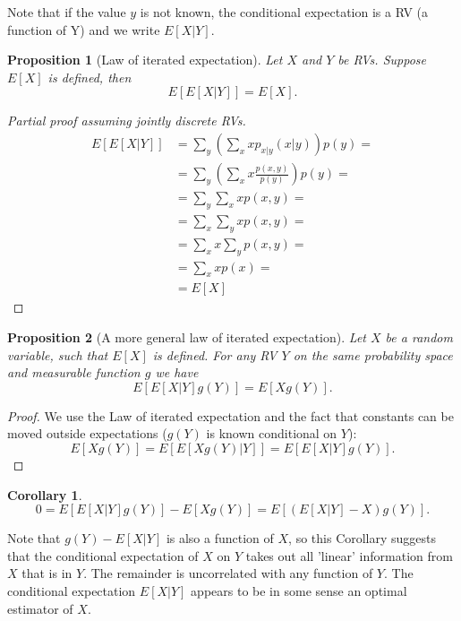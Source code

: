 \documentclass{book}
\theoremstyle{plain}%
\newtheorem{corollary}{Corollary}[section]
\newtheorem{proposition}{Proposition}[section]
\theoremstyle{definition}
\begin{document}
Note that if the value $y$ is not known, the conditional expectation is a RV (a function of Y) and we write $E[X|Y]$.

\begin{proposition}[Law of iterated expectation] Let $X$ and $Y$ be RVs. Suppose $E[X]$ is defined, then
$$E[E[X|Y]] = E[X].$$
\end{proposition}

\begin{proof}[Partial proof assuming jointly discrete RVs] \begin{align*}
E[E[X|Y]] &= \sum_y \left(\sum_x x p_{x|y}(x|y)\right) p(y) =\\
 &= \sum_y \left(\sum_x x \frac{p(x,y)}{p(y)}\right) p(y) =\\
 &= \sum_y \sum_x x p(x,y) =\\
 &= \sum_x \sum_y x p(x,y) =\\
  &= \sum_x x \sum_y p(x,y) =\\
  &= \sum_x x p(x) =\\
  &= E[X]
\end{align*}
\end{proof}

%
\begin{proposition}[A more general law of iterated expectation]
Let $X$ be a random variable, such that $E[X]$ is defined. For any RV $Y$ on the same probability space and measurable function $g$ we have
$$E[E[X|Y]g(Y)] = E[Xg(Y)].$$
\end{proposition}

\begin{proof}
We use the Law of iterated expectation and the fact that constants can be moved outside expectations ($g(Y)$ is known conditional on $Y$):
$$ E[Xg(Y)] = E[E[Xg(Y)|Y]] = E[E[X|Y]g(Y)].$$
\end{proof}

\begin{corollary}
$$0 = E[E[X|Y]g(Y)] - E[Xg(Y)] = E[(E[X|Y] - X)g(Y)].$$\label{cor:uncorr}
\end{corollary}

Note that $g(Y) - E[X|Y]$ is also a function of $X$, so this Corollary suggests that the conditional expectation of $X$ on $Y$ takes out all 'linear' information from $X$ that is in $Y$. The remainder is uncorrelated with any function of $Y$. The conditional expectation $E[X|Y]$ appears to be in some sense an optimal estimator of $X$.
\end{document}
